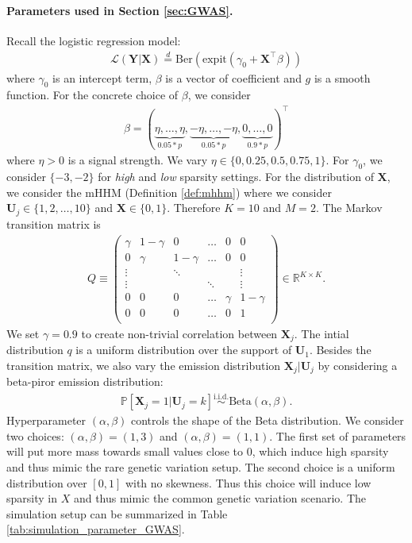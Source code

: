 \documentclass[12pt]{article}
\theoremstyle{definition}
\def\P{\mathbb{P}}
\def\P{\mathbb{P}}
\renewcommand{\P}{\mathbb{P}}							%
\newcommand{\expit}{\mathrm{expit}}                 	%
\newcommand{\prx}{\bm X}								%
\newcommand{\pry}{{\bm Y}}								%
\newcommand{\pru}{{\bm U}}								%
\newcommand{\law}{\mathcal L}							%
\begin{document}
\paragraph{Parameters used in Section \ref{sec:GWAS}.}
Recall the logistic regression model:
\begin{align*}
	\law(\pry|\prx)\overset{d}{=}\text{Ber}(\expit(\gamma_0 + \prx^\top \beta))
\end{align*}
where $\gamma_0$ is an intercept term, $\beta$ is a vector of coefficient and $g$ is a smooth function. For the concrete choice of $\beta$, we consider 
\begin{align*}
	\beta = (\underbrace{\eta,\ldots,\eta}_{0.05 * p},\underbrace{-\eta,\ldots,-\eta}_{0.05 * p},\underbrace{0,\ldots,0}_{0.9 * p})^\top
\end{align*}
where $\eta>0$ is a signal strength. We vary $\eta\in\{0, 0.25, 0.5, 0.75, 1\}$. For $\gamma_0$, we consider $\{-3,-2\}$ for \textit{high} and \textit{low} sparsity settings. For the distribution of $\prx$, we consider the mHHM (Definition \ref{def:mhhm}) where we consider $\pru_j\in\{1,2,\ldots,10\}$ and $\prx\in\{0,1\}$. Therefore $K=10$ and $M=2$. The Markov transition matrix is 
\begin{align*}
	Q\equiv 
	\begin{pmatrix}
		\gamma & 1-\gamma & 0 & \ldots & 0 & 0\\
		0 & \gamma & 1-\gamma & \ldots & 0 & 0\\
		\vdots & &  \ddots & & &\vdots\\
		\vdots & &  & \ddots & &\vdots\\
		0 & 0 & 0 & \ldots & \gamma & 1 - \gamma\\
		0 & 0 & 0 & \ldots & 0 & 1\\
	\end{pmatrix}
	\in\mathbb{R}^{K\times K}.
\end{align*}
We set $\gamma=0.9$ to create non-trivial correlation between $\prx_j$. The intial distribution $q$ is a uniform distribution over the support of $\pru_1$. Besides the transition matrix, we also vary the emission distribution $\prx_j|\pru_j$ by considering a beta-piror emission distribution:
\begin{align}\label{eq:beta_emission}
  \P[\prx_j=1|\pru_j=k]\overset{\mathrm{i.i.d.}}{\sim} \mathrm{Beta}(\alpha,\beta).
  \tag{beta-emission}
\end{align}
Hyperparameter $(\alpha,\beta)$ controls the shape of the Beta distribution. We consider two choices: $(\alpha,\beta)=(1,3)$ and $(\alpha,\beta)=(1,1)$. The first set of parameters will put more mass towards small values close to $0$, which induce high sparsity and thus mimic the rare genetic variation setup. The second choice is a uniform distribution over $[0,1]$ with no skewness. Thus this choice will induce low sparsity in $X$ and thus mimic the common genetic variation scenario. The simulation setup can be summarized in Table \ref{tab:simulation_parameter_GWAS}.
\end{document}
